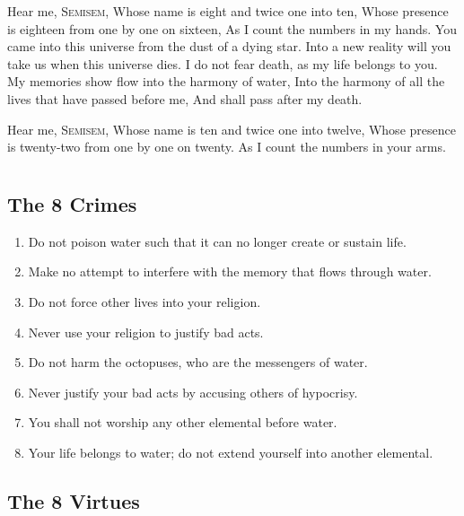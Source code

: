 \documentclass[12pt, letterpaper]{report}
\begin{document}
\begin{poem}
\begin{stanza}
Hear me, S\textsc{emisem},\verseline
Whose name is eight and twice one into ten,\verseline
Whose presence is eighteen from one by one on sixteen,\verseline
As I count the numbers in my hands.\verseline
You came into this universe from the dust of a dying star.\verseline
Into a new reality will you take us when this universe dies.\verseline
I do not fear death, as my life belongs to you.\verseline
My memories show flow into the harmony of water,\verseline
Into the harmony of all the lives that have passed before me,\verseline
And shall pass after my death.
\end{stanza}
\begin{stanza}
Hear me, S\textsc{emisem},\verseline
Whose name is ten and twice one into twelve,\verseline
Whose presence is twenty-two from one by one on twenty.\verseline
As I count the numbers in your arms.
\end{stanza}
\end{poem}


\chapter{}

\section{The 8 Crimes}

\begin{enumerate}
  \item Do not poison water such that it can no longer create or sustain life.
  \item Make no attempt to interfere with the memory that flows through water.
  \item Do not force other lives into your religion.
  \item Never use your religion to justify bad acts.
  \item Do not harm the octopuses, who are the messengers of water.
  \item Never justify your bad acts by accusing others of hypocrisy.
  \item You shall not worship any other elemental before water.
  \item Your life belongs to water; do not extend yourself into another elemental.
\end{enumerate}

\section{The 8 Virtues}
\end{document}
